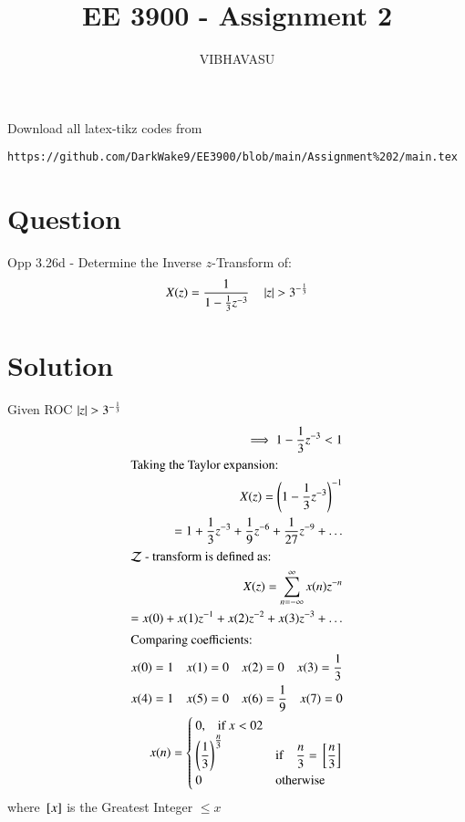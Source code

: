 \documentclass[journal,12pt,twocolumn]{IEEEtran}
\begin{document}
	\let\StandardTheFigure\thefigure
	\renewcommand{\thefigure}{\theproblem}
	
	
	
	\def\putbox#1#2#3{\makebox[0in][l]{\makebox[#1][l]{}\raisebox{\baselineskip}[0in][0in]{\raisebox{#2}[0in][0in]{#3}}}}
	\def\rightbox#1{\makebox[0in][r]{#1}}
	\def\centbox#1{\makebox[0in]{#1}}
	\def\topbox#1{\raisebox{-\baselineskip}[0in][0in]{#1}}
	\def\midbox#1{\raisebox{-0.5\baselineskip}[0in][0in]{#1}}
	
	\vspace{3cm}
	
	\title{ EE 3900 - Assignment 2}
	
	\author{VIBHAVASU}
	\onehalfspacing
	\maketitle
	Download all latex-tikz codes from
	\begin{lstlisting}
https://github.com/DarkWake9/EE3900/blob/main/Assignment%202/main.tex
	\end{lstlisting}
	\section{Question}
	Opp 3.26d - Determine the Inverse $z$-Transform of:
	\begin{align*}
		X(z) = \dfrac{1}{1 - \frac{1}{3}z^{-3}} \quad \left\vert z\right\vert > 3^{-\frac{1}{3}}
	\end{align*}
	\section{Solution}
	Given ROC $\left\vert z\right\vert > 3^{-\frac{1}{3}}$
	\begin{align}
		\implies 1 - \frac{1}{3}z^{-3} < 1 \\
	\intertext{Taking the Taylor expansion:}
		X(z) = \brak{1 - \frac{1}{3}z^{-3}}^{-1}\\
		= 1 + \frac{1}{3}z^{-3} + \frac{1}{9}z^{-6} + \frac{1}{27}z^{-9} + \ldots\\
	\intertext{${\mathcal{Z}}$ - transform is defined as:} X(z) = \sum_{n=-\infty}^{\infty} x(n) z^{-n}\\
		= x(0) + x(1)z^{-1} + x(2) z^{-2} + x(3) z^{-3} + \ldots\\
		\intertext{Comparing coefficients:}
		x(0) = 1 \quad x(1) = 0 \quad x(2) = 0 \quad x(3) = \frac{1}{3}\\
		x(4) = 1 \quad x(5) = 0 \quad x(6) = \frac{1}{9} \quad x(7) = 0\\
		x(n) = 
		\begin{cases}
			0, \quad $if $x < 02\\
			\brak{\dfrac{1}{3}}^{\tfrac{n}{3}} & $if$ \quad \dfrac{n}{3} = \sbrak{\dfrac{n}{3}}\\
			0 & \text{otherwise}
		\end{cases}
	\end{align}
\small
where ${}\left[x\right]$ is the Greatest Integer $\leq x$
		
\end{document}
